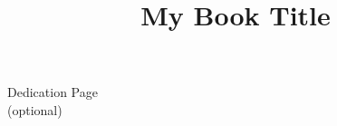 \documentclass{psp-book9x6}
\title{My Book Title}              %
\begin{document}
\titlepages                        %

\begin{dedication}
\large Dedication Page \\[13pt]    %
\large (optional)
\end{dedication}




\tableofcontents



\setcounter{page}{1}












%

\printindex
\end{document}
